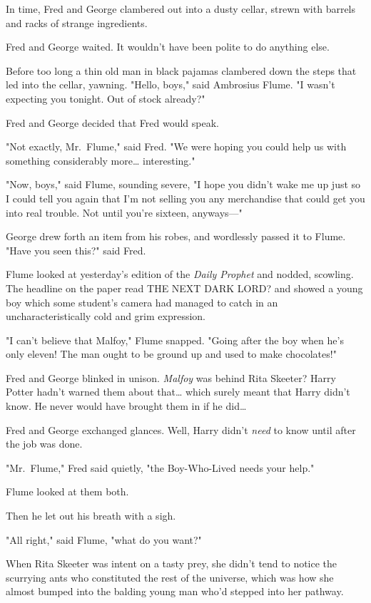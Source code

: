 In time, Fred and George clambered out into a dusty cellar, strewn with barrels
and racks of strange ingredients.

Fred and George waited. It wouldn't have been polite to do anything else.

Before too long a thin old man in black pajamas clambered down the steps that
led into the cellar, yawning. "Hello, boys," said Ambrosius Flume. "I wasn't
expecting you tonight. Out of stock already?"

Fred and George decided that Fred would speak.

"Not exactly, Mr.~Flume," said Fred. "We were hoping you could help us with
something considerably more{\ldots} interesting."

"Now, boys," said Flume, sounding severe, "I hope you didn't wake me up just so
I could tell you again that I'm not selling you any merchandise that could get
you into real trouble. Not until you're sixteen, anyways---"

George drew forth an item from his robes, and wordlessly passed it to Flume.
"Have you seen this?" said Fred.

Flume looked at yesterday's edition of the \emph{Daily Prophet} and nodded,
scowling. The headline on the paper read THE NEXT DARK LORD? and showed a young
boy which some student's camera had managed to catch in an uncharacteristically
cold and grim expression.

"I can't believe that Malfoy," Flume snapped. "Going after the boy when he's
only eleven! The man ought to be ground up and used to make chocolates!"

Fred and George blinked in unison. \emph{Malfoy} was behind Rita Skeeter? Harry
Potter hadn't warned them about that{\ldots} which surely meant that Harry
didn't know. He never would have brought them in if he did{\ldots}

Fred and George exchanged glances. Well, Harry didn't \emph{need} to know until
after the job was done.

"Mr.~Flume," Fred said quietly, "the Boy-Who-Lived needs your help."

Flume looked at them both.

Then he let out his breath with a sigh.

"All right," said Flume, "what do you want?"

When Rita Skeeter was intent on a tasty prey, she didn't tend to notice the
scurrying ants who constituted the rest of the universe, which was how she
almost bumped into the balding young man who'd stepped into her pathway.

